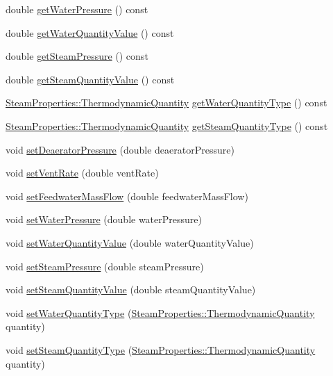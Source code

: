 \begin{DoxyCompactItemize}
double \hyperlink{class_deaerator_ae86ef305a8641d61ec76bd39bb84f28b}{get\+Water\+Pressure} () const
\item 
double \hyperlink{class_deaerator_a9362430fb04802b6f14c9bf09d62a466}{get\+Water\+Quantity\+Value} () const
\item 
double \hyperlink{class_deaerator_aebe779c63cace193d040f497e3b70728}{get\+Steam\+Pressure} () const
\item 
double \hyperlink{class_deaerator_a5473feedca64e7c44143d422ed3e2401}{get\+Steam\+Quantity\+Value} () const
\item 
\hyperlink{class_steam_properties_ae0294bedf7d178c2d8fb6aed0f62fbff}{Steam\+Properties\+::\+Thermodynamic\+Quantity} \hyperlink{class_deaerator_a414282f81906e09a28bc75cf51659ec2}{get\+Water\+Quantity\+Type} () const
\item 
\hyperlink{class_steam_properties_ae0294bedf7d178c2d8fb6aed0f62fbff}{Steam\+Properties\+::\+Thermodynamic\+Quantity} \hyperlink{class_deaerator_a18abbdc5ec78f71e1d2495b0c64c77ec}{get\+Steam\+Quantity\+Type} () const
\item 
void \hyperlink{class_deaerator_a5b20d3aba98b21928cce70b45e843ff3}{set\+Deaerator\+Pressure} (double deaerator\+Pressure)
\item 
void \hyperlink{class_deaerator_a11e71194f58763a57ec0f7d05a21782d}{set\+Vent\+Rate} (double vent\+Rate)
\item 
void \hyperlink{class_deaerator_ada95cb2557bc43602d7bcefbad66c853}{set\+Feedwater\+Mass\+Flow} (double feedwater\+Mass\+Flow)
\item 
void \hyperlink{class_deaerator_ae23f64c6983daed388a73c033a15e176}{set\+Water\+Pressure} (double water\+Pressure)
\item 
void \hyperlink{class_deaerator_ac31cf2deb8bf30ee6921d1d9f8281eb8}{set\+Water\+Quantity\+Value} (double water\+Quantity\+Value)
\item 
void \hyperlink{class_deaerator_a5936221e68b5ba3245f0adabed74e6d7}{set\+Steam\+Pressure} (double steam\+Pressure)
\item 
void \hyperlink{class_deaerator_a101399a8b66c3ff1fecf884fd1b1373d}{set\+Steam\+Quantity\+Value} (double steam\+Quantity\+Value)
\item 
void \hyperlink{class_deaerator_ac60ad3d6650ed6c7783d18833bb7e3dd}{set\+Water\+Quantity\+Type} (\hyperlink{class_steam_properties_ae0294bedf7d178c2d8fb6aed0f62fbff}{Steam\+Properties\+::\+Thermodynamic\+Quantity} quantity)
\item 
void \hyperlink{class_deaerator_a1aa3b3de064d148479af9576e717b6c2}{set\+Steam\+Quantity\+Type} (\hyperlink{class_steam_properties_ae0294bedf7d178c2d8fb6aed0f62fbff}{Steam\+Properties\+::\+Thermodynamic\+Quantity} quantity)
\end{DoxyCompactItemize}


